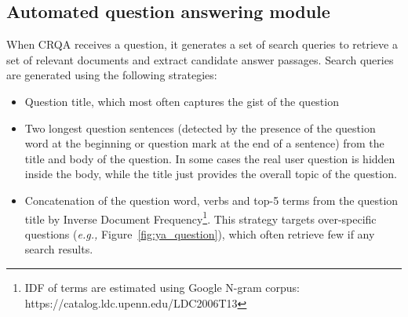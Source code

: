 \documentclass[letterpaper]{article}
\makeatletter
\newcommand{\eg}{\textit{e.g.,}\@\xspace}
\makeatother
\begin{document}
\subsection{Automated question answering module}
\label{sec:system:auto}

When CRQA receives a question, it generates a set of search queries to retrieve a set of relevant documents and extract candidate answer passages.
Search queries are generated using the following strategies:
\begin{itemize}
\item Question title, which most often captures the gist of the question
\item Two longest question sentences (detected by the presence of the question word at the beginning or question mark at the end of a sentence) from the title and body of the question. In some cases the real user question is hidden inside the body, while the title just provides the overall topic of the question.
\item Concatenation of the question word, verbs and top-5 terms from the question title by Inverse Document Frequency\footnote{IDF of terms are estimated using Google N-gram corpus: https://catalog.ldc.upenn.edu/LDC2006T13}. This strategy targets over-specific questions (\eg Figure~\ref{fig:ya_question}), which often retrieve few if any search results.
\end{itemize}
\end{document}
